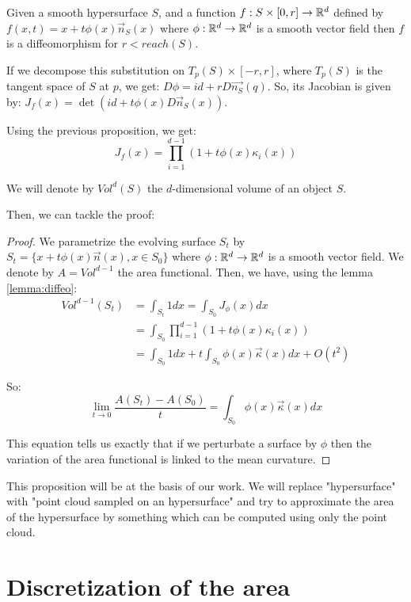 \begin{lemma}
    \label{lemma:diffeo}
    Given a smooth hypersurface $ S $, and a function $ f : S \times [0, r] \to \mathbb{R}^d $
    defined by $ f(x, t) = x + t \phi(x) \vec{n}_S(x) $ where $ \phi : \mathbb{R}^d \to
    \mathbb{R}^d $ is a smooth vector field then $ f $ is a diffeomorphism for $ r < reach(S) $.

    If we decompose this substitution on $ T_p(S) \times [-r, r] $, where $ T_p(S)
    $ is the tangent space of $ S $ at $ p $, we get: $ D \phi = id + r D
    \vec{n_S}(q) $.  So, its Jacobian is given by: $ J_f(x) = \det(id + t \phi(x) D
    \vec{n}_S (x)) $.

    Using the previous proposition, we get:
    $$ J_f(x) = \prod_{i=1}^{d-1} (1 + t \phi(x) \kappa_i(x)) $$
\end{lemma}

We will denote by $ Vol^d(S) $ the $d$-dimensional volume of an object $ S
$.

Then, we can tackle the proof:

\begin{proof}
    We parametrize the evolving surface $ S_t $ by $ S_t = \{ x + t \phi(x)
    \vec{n}(x), x \in S_0\} $ where $ \phi : \mathbb{R}^d \rightarrow \mathbb{R}^d $ is a smooth
    vector field. We denote by $ A = Vol^{d-1} $ the area functional.
    Then, we have, using the lemma \ref{lemma:diffeo}:
    \begin{align*}
        Vol^{d-1}(S_t) &= \int_{S_t} 1 dx = \int_{S_0} J_{\phi}(x) dx \\
        &= \int_{S_0} \prod_{i=1}^{d-1} (1 + t \phi(x) \kappa_i(x)) \\
        &= \int_{S_0} 1dx + t \int_{S_0} \phi(x) \vec{\kappa}(x) dx + O(t^2)
    \end{align*}

    So:
    $$ \lim\limits_{t \to 0} \frac{A(S_t) - A(S_0)}{t}= \int_{S_0}
    \phi(x) \vec{\kappa}(x) dx $$

    This equation tells us exactly that if we perturbate a surface by $ \phi $
    then the variation of the area functional is linked to the mean curvature.
\end{proof}

This proposition will be at the basis of our work. We will replace "hypersurface"
with "point cloud sampled on an hypersurface" and try to approximate the area of
the hypersurface by something which can be computed using only the point cloud.

\section{Discretization of the area}

